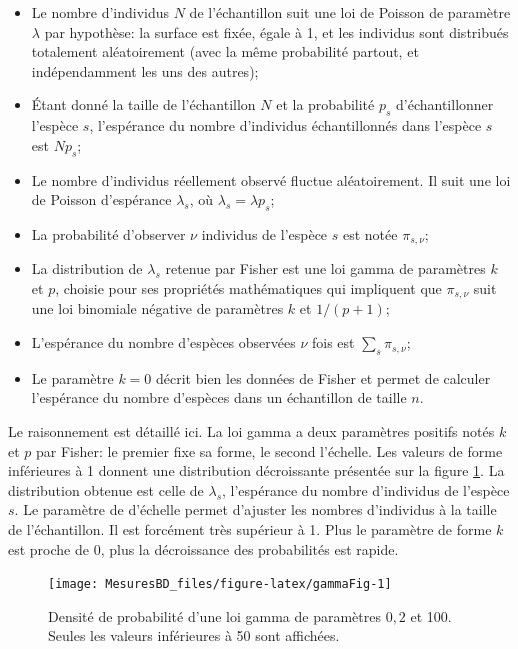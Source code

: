\documentclass[
  11pt,
  french,
  a4paper,
  extrafontsizes,onecolumn,openright
  ]{memoir}
\providecommand{\tightlist}{%
  \setlength{\itemsep}{0pt}\setlength{\parskip}{0pt}}
\begin{document}
\begin{itemize}
\tightlist
\item
  Le nombre d'individus \(N\) de l'échantillon suit une loi de Poisson de paramètre \(\lambda\) par hypothèse: la surface est fixée, égale à 1, et les individus sont distribués totalement aléatoirement (avec la même probabilité partout, et indépendamment les uns des autres);
\item
  Étant donné la taille de l'échantillon \(N\) et la probabilité \(p_s\) d'échantillonner l'espèce \(s\), l'espérance du nombre d'individus échantillonnés dans l'espèce \(s\) est \(Np_s\);
\item
  Le nombre d'individus réellement observé fluctue aléatoirement.
  Il suit une loi de Poisson d'espérance \(\lambda_s\), où \(\lambda_s=\lambda p_s\);
\item
  La probabilité d'observer \(\nu\) individus de l'espèce \(s\) est notée \({\pi}_{s,\nu}\);
\item
  La distribution de \(\lambda_s\) retenue par Fisher est une loi gamma de paramètres \(k\) et \(p\), choisie pour ses propriétés mathématiques qui impliquent que \({\pi}_{s,\nu}\) suit une loi binomiale négative de paramètres \(k\) et \(1/(p+1)\);
\item
  L'espérance du nombre d'espèces observées \(\nu\) fois est \(\sum_s{{\pi}_{s,\nu}}\);
\item
  Le paramètre \(k=0\) décrit bien les données de Fisher et permet de calculer l'espérance du nombre d'espèces dans un échantillon de taille \(n\).
\end{itemize}

Le raisonnement est détaillé ici.
La loi gamma a deux paramètres positifs notés \(k\) et \(p\) par Fisher: le premier fixe sa forme, le second l'échelle.
Les valeurs de forme inférieures à 1 donnent une distribution décroissante présentée sur la figure \ref{fig:gammaFig}.
La distribution obtenue est celle de \(\lambda_s\), l'espérance du nombre d'individus de l'espèce \(s\).
Le paramètre de d'échelle permet d'ajuster les nombres d'individus à la taille de l'échantillon.
Il est forcément très supérieur à 1.
Plus le paramètre de forme \(k\) est proche de 0, plus la décroissance des probabilités est rapide.



\scriptsize

\begin{figure}

{\centering \texttt{[image: MesuresBD\_files/figure-latex/gammaFig-1]} 

}

\caption{Densité de probabilité d'une loi gamma de paramètres \(0,2\) et 100. Seules les valeurs inférieures à 50 sont affichées.}\label{fig:gammaFig}
\end{figure}
\end{document}
